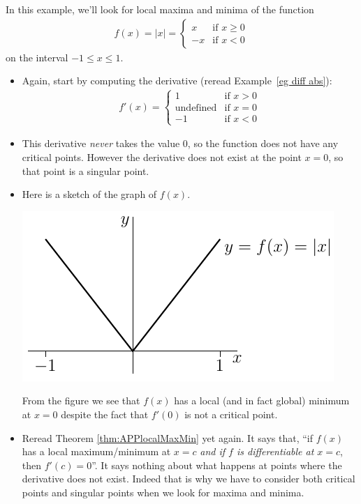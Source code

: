 \begin{eg}\label{eg:localMinMaxC}
In this example, we'll look for local maxima and minima of the function
\begin{align*}
f(x) = |x| = \begin{cases}
           x  & \text{if }x \ge 0 \\
           -x & \text{if }x <  0
       \end{cases}
\end{align*}
on the interval $-1\le x\le 1$.
\begin{itemize}
 \item Again, start by computing the derivative (reread Example~\ref{eg diff
abs}):
\begin{align*}
f'(x) = \begin{cases}
           1  & \text{if }x > 0 \\
           \text{undefined}  & \text{if }x = 0 \\
           -1 & \text{if }x <  0
       \end{cases}
\end{align*}
\item This derivative \emph{never} takes the value $0$, so the function does
not have any critical points. However the derivative does not exist at the
point $x=0$, so that point is a singular point.

\item Here is a sketch of the graph of $f(x)$.
\begin{efig}
\begin{center}
   \includegraphics{localMaxMinC}
\end{center}
\end{efig}
From the figure we see that $f(x)$ has a local (and in fact global)
minimum at $x=0$ despite the fact that $f'(0)$ is not a critical point.
\item Reread Theorem \ref{thm:APPlocalMaxMin} yet again. It says that,
``if $f(x)$ has a local maximum/minimum at $x=c$
\emph{and if $f$ is differentiable at $x=c$}, then $f'(c)=0$''.
It says nothing about what happens at points where the derivative does
not exist. Indeed that is why we have to consider both critical points and
singular points when we look for maxima and minima.
\end{itemize}
\end{eg}




